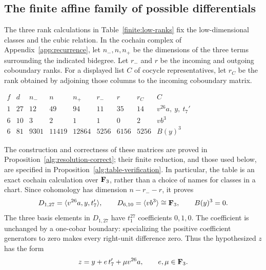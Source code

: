\subsection{The finite affine family of possible differentials}

The three rank calculations in Table~\ref{finite:low-ranks} fix the
low-dimensional classes and the cubic relation.  In the cochain complex of
Appendix~\ref{app:recurrence}, let $n_-,n,n_+$ be the dimensions of
the three terms surrounding the indicated bidegree.  Let $r_-$ and
$r$ be the incoming and outgoing coboundary ranks.  For a displayed
list $C$ of cocycle representatives, let $r_C$ be the rank obtained
by adjoining those columns to the incoming coboundary matrix.

\begin{table}[htbp]
\centering
\(
\begin{array}{cc|rrr|rr|r|l}
 f&d&n_-&n&n_+&r_-&r&r_C&C\\\hline
 1&27&12&49&94&11&35&14&v^{26}a,\ y,\ t_7'\\
 6&10&3&2&1&1&0&2&vb^3\\
 6&81&9301&11419&12864&5256&6156&5256&B(y)^3
\end{array}
\)
\caption{Cochain ranks identifying the distinguished classes.}
\label{finite:low-ranks}
\end{table}

The construction and correctness of these matrices are proved in
Proposition~\ref{alg:resolution-correct}; their finite reduction, and
those used below, are specified in
Proposition~\ref{alg:table-verification}.  In particular, the table is
an exact cochain calculation over $\mathbf F_3$, rather than a choice of
names for classes in a chart.  Since cohomology has dimension
$n-r_--r$, it proves
\begin{equation}\label{finite:low-classes}
 D_{1,27}=\langle v^{26}a,y,t_7'\rangle,\qquad
 D_{6,10}=\langle vb^3\rangle\cong\mathbf F_3,\qquad B(y)^3=0.
\end{equation}
The three basis elements in $D_{1,27}$ have $t_1^{27}$ coefficients
$0,1,0$.  The coefficient is unchanged by a one-cobar boundary:
specializing the positive coefficient generators to zero makes every
right-unit difference zero.  Thus the hypothesized $z$ has the form
\begin{equation}\label{finite:z-form}
 z=y+e\,t_7'+\mu v^{26}a,\qquad e,\mu\in\mathbf F_3.
\end{equation}

